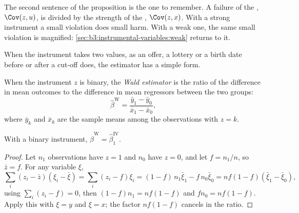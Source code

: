 The second sentence of the proposition is the one to remember. A failure of
the , $\Cov(z, u)$, is divided by the strength of the
, $\Cov(z, x)$. With a strong instrument a small violation does
small harm. With a weak one, the same small violation is magnified:
\cref{sec:b3:instrumental-variables:weak} returns to it.

When the instrument takes two values, as an offer, a lottery or a birth date
before or after a cut-off does, the estimator has a simple form.

\begin{definition}\label{def:b3:instrumental-variables:wald}
When the instrument $z$ is binary, the \emph{Wald estimator} is the ratio of
the difference in mean outcomes to the difference in mean regressors between
the two groups:
\[
  \hat\beta^{\mathrm{W}} = \frac{\bar y_1 - \bar y_0}{\bar x_1 - \bar x_0},
\]
where $\bar y_k$ and $\bar x_k$ are the sample means among the observations
with $z = k$.
\end{definition}

\begin{proposition}\label{prop:b3:instrumental-variables:wald}
With a binary instrument, $\hat\beta^{\mathrm{W}} = \hat\beta_1^{\mathrm{IV}}$.
\end{proposition}

\begin{proof}
Let $n_1$ observations have $z = 1$ and $n_0$ have $z = 0$, and let $f = n_1/n$,
so $\bar z = f$. For any variable $\xi$,
\[
  \sum_i (z_i - \bar z)(\xi_i - \bar\xi) = \sum_i (z_i - f) \xi_i = (1 - f)\,n_1 \bar\xi_1 - f\, n_0 \bar\xi_0
  = n f (1 - f)(\bar\xi_1 - \bar\xi_0),
\]
using $\sum_i (z_i - f) = 0$, then $(1-f) n_1 = n f (1 - f)$ and $f n_0 = n f
(1 - f)$. Apply this with $\xi = y$ and $\xi = x$; the factor $nf(1-f)$ cancels in
the ratio.
\end{proof}

